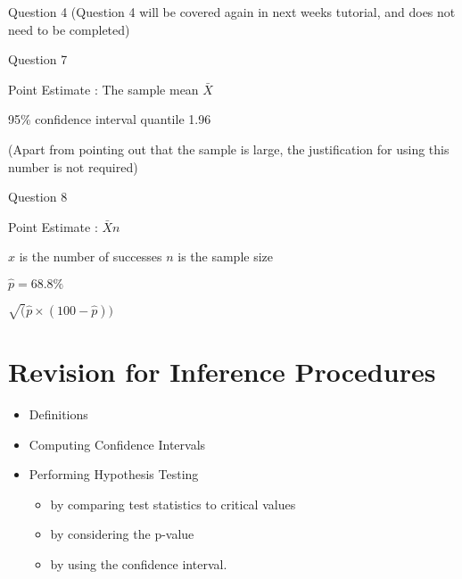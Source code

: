 \documentclass[]{report}
\begin{document}
{{Question 4
(Question 4 will be covered again in next weeks tutorial, and does not need to be completed)













Question 7

Point Estimate : The sample mean $\bar{X}$

95\% confidence interval quantile 1.96 

(Apart from pointing out that the sample is large, the justification for using this number is not required)

Question 8

Point Estimate : $\bar{X}{n}$

$x$ is the number of successes
$n$ is the sample size

$\hat{p} = 68.8\%$


$\sqrt(\hat{p} \times (100-\hat{p} ))$


\section{Revision for Inference Procedures}

\begin{itemize}
\item Definitions
\item Computing Confidence Intervals 
\item Performing Hypothesis Testing
\begin{itemize}
\item by comparing test statistics to critical values
\item by considering the p-value
\item by using the confidence interval.
\end{itemize}
\end{itemize}





}}
\end{document}
